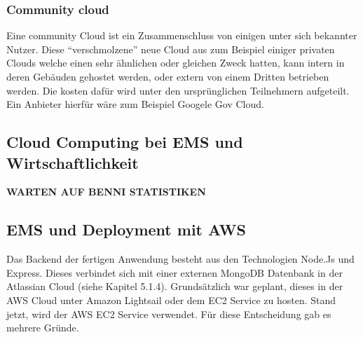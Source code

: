 \subsubsection{Community cloud}
Eine community Cloud ist ein Zusammenschluss von einigen unter sich bekannter Nutzer. Diese "`verschmolzene"' neue Cloud aus zum Beispiel einiger privaten Clouds welche einen sehr ähnlichen oder gleichen Zweck hatten, kann intern in deren Gebäuden gehostet werden, oder extern von einem Dritten betrieben werden. Die kosten dafür wird unter den ursprünglichen Teilnehmern aufgeteilt.
Ein Anbieter hierfür wäre zum Beispiel Googele Gov Cloud.


\subsection{Cloud Computing bei EMS und Wirtschaftlichkeit}

\textbf{WARTEN AUF BENNI STATISTIKEN}

\subsection{EMS und Deployment mit AWS}
Das Backend der fertigen Anwendung besteht aus den Technologien Node.Js und Express. Dieses verbindet sich mit einer externen MongoDB Datenbank in der Atlassian Cloud (siehe Kapitel 5.1.4). Grundsätzlich war geplant, dieses in der AWS Cloud unter Amazon Lightsail oder dem EC2 Service zu hosten. Stand jetzt, wird der AWS EC2 Service verwendet. Für diese Entscheidung gab es mehrere Gründe.


\newpage
 